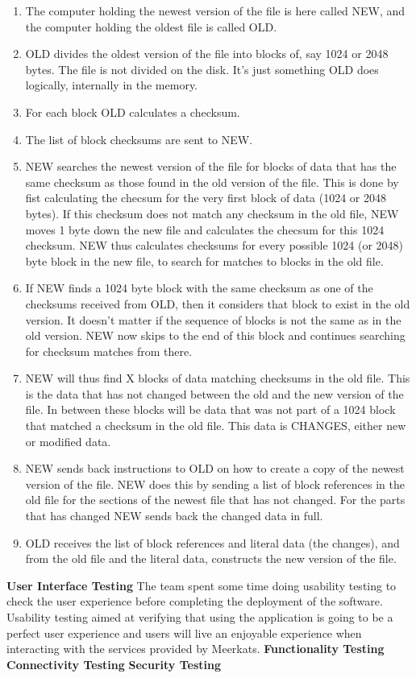 \documentclass{article}
\begin{document}
\begin{enumerate}
\item The computer holding the newest version of the file is here called NEW, and the computer holding the oldest file is called OLD.
\item OLD divides the oldest version of the file into blocks of, say 1024 or 2048 bytes. The file is not divided on the disk. It's just something OLD does logically, internally in the memory.
\item For each block OLD calculates a checksum.
\item The list of block checksums are sent to NEW.
\item NEW searches the newest version of the file for blocks of data that has the same checksum as those found in the old version of the file. This is done by fist calculating the checsum for the very first block of data (1024 or 2048 bytes). If this checksum does not match any checksum in the old file, NEW moves 1 byte down the new file and calculates the checsum for this 1024 checksum. NEW thus calculates checksums for every possible 1024 (or 2048) byte block in the new file, to search for matches to blocks in the old file.
\item If NEW finds a 1024 byte block with the same checksum as one of the checksums received from OLD, then it considers that block to exist in the old version. It doesn't matter if the sequence of blocks is not the same as in the old version. NEW now skips to the end of this block and continues searching for checksum matches from there.
\item NEW will thus find X blocks of data matching checksums in the old file. This is the data that has not changed between the old and the new version of the file. In between these blocks will be data that was not part of a 1024 block that matched a checksum in the old file. This data is CHANGES, either new or modified data.
\item NEW sends back instructions to OLD on how to create a copy of the newest version of the file. NEW does this by sending a list of block references in the old file for the sections of the newest file that has not changed. For the parts that has changed NEW sends back the changed data in full.
\item OLD receives the list of block references and literal data (the changes), and from the old file and the literal data, constructs the new version of the file.
\end{enumerate}
\textbf{User Interface Testing}
The team spent some time doing usability testing to check the user experience before completing the deployment of the software. Usability testing aimed at verifying that using the application is going to be a perfect user experience and users will live an enjoyable experience when interacting with the services provided by Meerkats.
\newline
\hfill \break
\textbf{Functionality Testing}
\newline
\hfill \break
\textbf{Connectivity Testing}
\newline
\hfill \break
\textbf{Security Testing}
\end{document}
